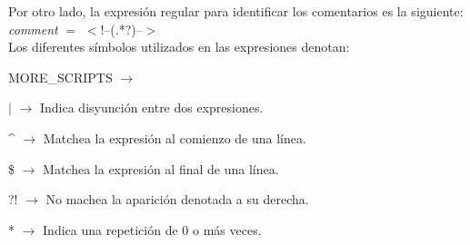 Por otro lado, la expresi\'on regular para identificar los comentarios es la siguiente:\\

\indent \indent \textit{comment } $=$ $<$!--(.*?)--$>$\\

Los diferentes s\'imbolos utilizados en las expresiones denotan:
	
  \begin{xlist}{MORE\_SCRIPTS $\longrightarrow$}
    \item[$\vert$ $\longrightarrow$] 	Indica disyunci\'on entre dos expresiones.
    \item[\string^ $\longrightarrow$	]Matchea la expresi\'on al comienzo de una l\'inea. 
    \item[\$ $\longrightarrow$]		Matchea la expresi\'on al final de una l\'inea. 
    \item[?! $\longrightarrow$]		No machea la aparici\'on denotada a su derecha.
    \item[* $\longrightarrow$] 		Indica una repetici\'on de 0 o m\'as veces.
  \end{xlist}
